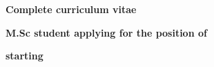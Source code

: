 \vspace{0.5cm}
\if {}
    \begin{center}
        {\LARGE {\color{black}\textbf{Complete curriculum vitae}}}
    \end{center}
\else
    \begin{center}
        {\fontsize{16pt}{16pt} {\color{black}\textbf{M.Sc student applying for the \moreinfo position of}}}
    \end{center}
    \vspace{-2mm}
    \begin{center}
        {\fontsize{16pt}{16pt} {\color{black}\textbf{\jobTitle starting \starting}}}
    \end{center}
\fi